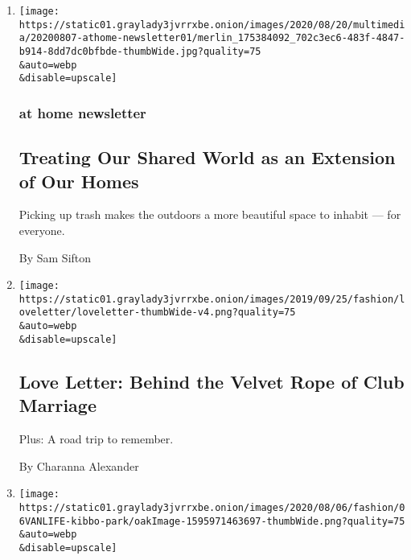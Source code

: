 \begin{enumerate}
\def\labelenumi{\arabic{enumi}.}
\item
  \href{/2020/08/07/at-home/newsletter.html}{}

  \texttt{[image: https://static01.graylady3jvrrxbe.onion/images/2020/08/20/multimedia/20200807-athome-newsletter01/merlin\_175384092\_702c3ec6-483f-4847-b914-8dd7dc0bfbde-thumbWide.jpg?quality=75\\\&auto=webp\\\&disable=upscale]}

  \hypertarget{at-home-newsletter}{%
  \subsubsection{at home newsletter}\label{at-home-newsletter}}

  \hypertarget{treating-our-shared-world-as-an-extension-of-our-homes}{%
  \subsection{Treating Our Shared World as an Extension of Our
  Homes}\label{treating-our-shared-world-as-an-extension-of-our-homes}}

  Picking up trash makes the outdoors a more beautiful space to inhabit
  --- for everyone.

  By Sam Sifton
\item
  \href{/2020/08/07/style/love-letter-newsletter-behind-the-velvet-rope-of-club-marriage.html}{}

  \texttt{[image: https://static01.graylady3jvrrxbe.onion/images/2019/09/25/fashion/loveletter/loveletter-thumbWide-v4.png?quality=75\\\&auto=webp\\\&disable=upscale]}

  \hypertarget{love-letter-behind-the-velvet-rope-of-club-marriage-2}{%
  \subsection{Love Letter: Behind the Velvet Rope of Club
  Marriage}\label{love-letter-behind-the-velvet-rope-of-club-marriage-2}}

  Plus: A road trip to remember.

  By Charanna Alexander
\item
  \href{/2020/08/07/style/kibbo-van-life-startup.html}{}

  \texttt{[image: https://static01.graylady3jvrrxbe.onion/images/2020/08/06/fashion/06VANLIFE-kibbo-park/oakImage-1595971463697-thumbWide.png?quality=75\\\&auto=webp\\\&disable=upscale]}


\end{enumerate}
